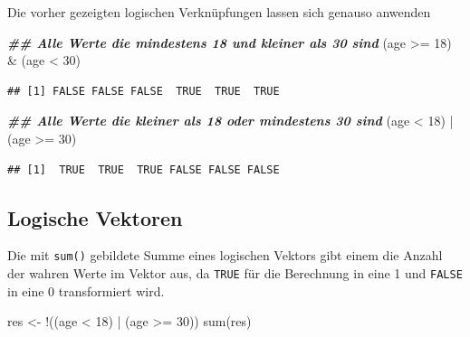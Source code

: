 \documentclass[
]{book}
\newenvironment{Shaded}{\begin{snugshade}}{\end{snugshade}}
\newcommand{\DecValTok}[1]{\textcolor[rgb]{0.00,0.00,0.81}{#1}}
\newcommand{\DocumentationTok}[1]{\textcolor[rgb]{0.56,0.35,0.01}{\textbf{\textit{#1}}}}
\newcommand{\FunctionTok}[1]{\textcolor[rgb]{0.00,0.00,0.00}{#1}}
\newcommand{\NormalTok}[1]{#1}
\newcommand{\OtherTok}[1]{\textcolor[rgb]{0.56,0.35,0.01}{#1}}
\newcommand{\SpecialCharTok}[1]{\textcolor[rgb]{0.00,0.00,0.00}{#1}}
\begin{document}
Die vorher gezeigten logischen Verknüpfungen lassen sich genauso anwenden

\begin{Shaded}
\begin{Highlighting}[]
 \DocumentationTok{\#\# Alle Werte die mindestens 18 und kleiner als 30 sind}
\NormalTok{(age }\SpecialCharTok{\textgreater{}=} \DecValTok{18}\NormalTok{) }\SpecialCharTok{\&}\NormalTok{ (age }\SpecialCharTok{\textless{}} \DecValTok{30}\NormalTok{)}
\end{Highlighting}
\end{Shaded}

\begin{verbatim}
## [1] FALSE FALSE FALSE  TRUE  TRUE  TRUE
\end{verbatim}

\begin{Shaded}
\begin{Highlighting}[]
\DocumentationTok{\#\# Alle Werte die kleiner als 18 oder mindestens 30 sind}
\NormalTok{(age }\SpecialCharTok{\textless{}} \DecValTok{18}\NormalTok{) }\SpecialCharTok{|}\NormalTok{ (age }\SpecialCharTok{\textgreater{}=} \DecValTok{30}\NormalTok{) }
\end{Highlighting}
\end{Shaded}

\begin{verbatim}
## [1]  TRUE  TRUE  TRUE FALSE FALSE FALSE
\end{verbatim}

\hypertarget{logische-vektoren}{%
\subsection{Logische Vektoren}\label{logische-vektoren}}

Die mit \texttt{sum()} gebildete Summe eines logischen Vektors gibt einem die Anzahl der wahren Werte im Vektor aus, da \texttt{TRUE} für die Berechnung in eine 1 und \texttt{FALSE} in eine 0 transformiert wird.

\begin{Shaded}
\begin{Highlighting}[]
\NormalTok{res }\OtherTok{\textless{}{-}} \SpecialCharTok{!}\NormalTok{((age }\SpecialCharTok{\textless{}} \DecValTok{18}\NormalTok{) }\SpecialCharTok{|}\NormalTok{ (age }\SpecialCharTok{\textgreater{}=} \DecValTok{30}\NormalTok{))}
\FunctionTok{sum}\NormalTok{(res)}
\end{Highlighting}
\end{Shaded}
\end{document}
